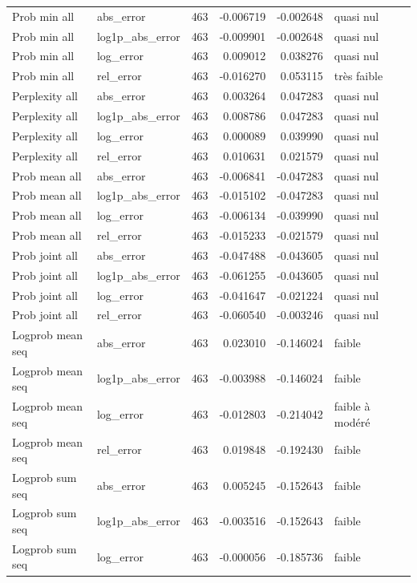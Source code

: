 \begin{longtable}{p{4.0cm}p{2.5cm}rrrll}
Prob min all & abs\_error & 463 & -0.006719 & -0.002648 & quasi nul \\
Prob min all & log1p\_abs\_error & 463 & -0.009901 & -0.002648 & quasi nul \\
Prob min all & log\_error & 463 & 0.009012 & 0.038276 & quasi nul \\
Prob min all & rel\_error & 463 & -0.016270 & 0.053115 & très faible \\
Perplexity all & abs\_error & 463 & 0.003264 & 0.047283 & quasi nul \\
Perplexity all & log1p\_abs\_error & 463 & 0.008786 & 0.047283 & quasi nul \\
Perplexity all & log\_error & 463 & 0.000089 & 0.039990 & quasi nul \\
Perplexity all & rel\_error & 463 & 0.010631 & 0.021579 & quasi nul \\
Prob mean all & abs\_error & 463 & -0.006841 & -0.047283 & quasi nul \\
Prob mean all & log1p\_abs\_error & 463 & -0.015102 & -0.047283 & quasi nul \\
Prob mean all & log\_error & 463 & -0.006134 & -0.039990 & quasi nul \\
Prob mean all & rel\_error & 463 & -0.015233 & -0.021579 & quasi nul \\
Prob joint all & abs\_error & 463 & -0.047488 & -0.043605 & quasi nul \\
Prob joint all & log1p\_abs\_error & 463 & -0.061255 & -0.043605 & quasi nul \\
Prob joint all & log\_error & 463 & -0.041647 & -0.021224 & quasi nul \\
Prob joint all & rel\_error & 463 & -0.060540 & -0.003246 & quasi nul \\
Logprob mean seq & abs\_error & 463 & 0.023010 & -0.146024 & faible \\
Logprob mean seq & log1p\_abs\_error & 463 & -0.003988 & -0.146024 & faible \\
Logprob mean seq & log\_error & 463 & -0.012803 & -0.214042 & faible à modéré \\
Logprob mean seq & rel\_error & 463 & 0.019848 & -0.192430 & faible \\
Logprob sum seq & abs\_error & 463 & 0.005245 & -0.152643 & faible \\
Logprob sum seq & log1p\_abs\_error & 463 & -0.003516 & -0.152643 & faible \\
Logprob sum seq & log\_error & 463 & -0.000056 & -0.185736 & faible \\

\end{longtable}
